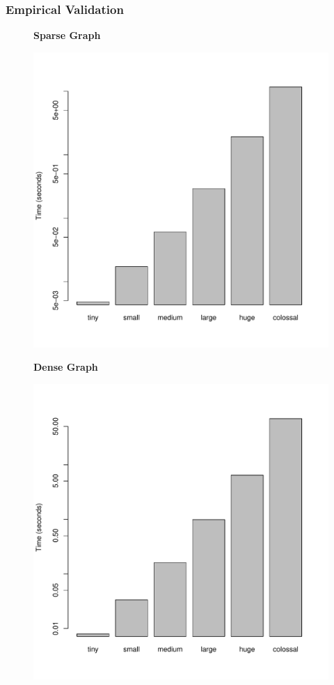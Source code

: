 \documentclass[a4paper,12pt]{article}
\begin{document}
\subsubsection{Empirical Validation}
\begin{figure}[H]
  \centering
  \textbf{Sparse Graph}\par\medskip
  \includegraphics[scale=0.3]{Johnson-Min-Heapsparse}
\end{figure}
\begin{figure}[H]
  \centering
  \textbf{Dense Graph}\par\medskip
  \includegraphics[scale=0.3]{Johnson-Min-Heapdense}
\end{figure}
\end{document}
